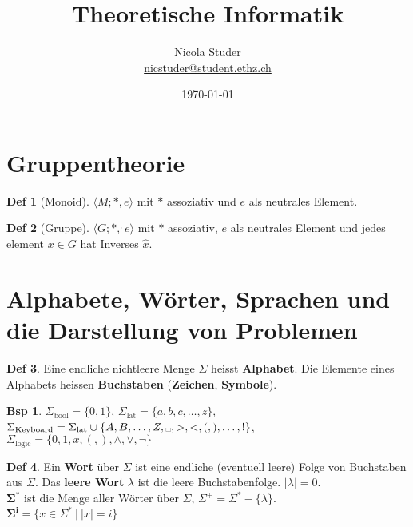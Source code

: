 \documentclass[a4paper, 10pt]{article}
\title{Theoretische Informatik}
\author{Nicola Studer \\ \href{mailto:nicstuder@student.ethz.ch}{nicstuder@student.ethz.ch}}
\date{\today}
\theoremstyle{definition}
\newtheorem{definition}{Def}[section]
\newtheorem*{example}{Bsp}
\newcommand{\words}{\Sigma^*}
\newcommand{\A}{\Sigma}
\begin{document}
\maketitle

\section{Gruppentheorie}
\begin{definition}[Monoid]
    \(\langle M; *, e\rangle\) mit \(*\) assoziativ und \(e\) als neutrales Element.
\end{definition}

\begin{definition}[Gruppe]
    \(\langle G; *, ^, e\rangle\) mit \(*\) assoziativ, \(e\) als neutrales Element und jedes element \(x \in G\) hat Inverses \(\hat{x}\).
\end{definition}

\section{Alphabete, Wörter, Sprachen und die Darstellung von Problemen}

\begin{definition}
    Eine endliche nichtleere Menge \(\A\) heisst \textbf{Alphabet}. Die Elemente eines Alphabets heissen \textbf{Buchstaben} (\textbf{Zeichen}, \textbf{Symbole}).
\end{definition}

\begin{example}
    \(\A_{\text{bool}} = \{0, 1\}\), \(\A_{\text{lat}} = \{a, b, c, \ldots, z\}\), \\
    \(\A_{\text{Keyboard}} = \A_{\text{lat}} \cup \{A, B, \ldots, Z, \text{\textvisiblespace}, >, <, (, ), \ldots, !\}\), \\
    \(\A_{\text{logic}} = \{0, 1, x, (, ), \land, \lor, \lnot \}\)
\end{example}

\begin{definition}
    Ein \textbf{Wort} über \(\A\) ist eine endliche (eventuell leere) Folge von Buchstaben aus \(\A\). Das \textbf{leere Wort} \(\lambda\) ist die leere Buchstabenfolge. \(|\lambda| = 0\). \\
    \(\bm{\words}\) ist die Menge aller Wörter über \(\A\), \(\A^+ = \words - \{\lambda\}\). \\
    \(\bm{\A^i} = \{x \in \words \ | \ |x| = i\}\)
\end{definition}
\end{document}
